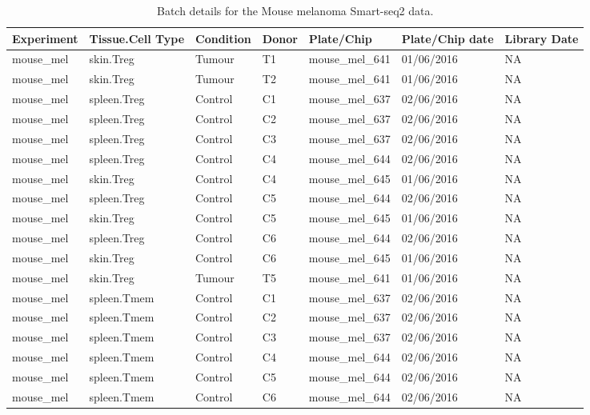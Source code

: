 \begin{table}[htp!]
\scriptsize
\caption[Batch details for the Mouse melanoma Smart-seq2 data]{Batch details for the Mouse melanoma Smart-seq2 data.}
\centering
\label{table:tab_A_batch_SS2_mel}
\begin{tabular}{lllllll}
  \toprule
Experiment & Tissue.Cell Type & Condition & Donor & Plate/Chip & Plate/Chip date & Library Date \\ 
  \midrule
  mouse\_mel & skin.Treg & Tumour & T1 & mouse\_mel\_641 & 01/06/2016 & NA \\ 
  mouse\_mel & skin.Treg & Tumour & T2 & mouse\_mel\_641 & 01/06/2016 & NA \\ 
  mouse\_mel & spleen.Treg & Control & C1 & mouse\_mel\_637 & 02/06/2016 & NA \\ 
  mouse\_mel & spleen.Treg & Control & C2 & mouse\_mel\_637 & 02/06/2016 & NA \\ 
  mouse\_mel & spleen.Treg & Control & C3 & mouse\_mel\_637 & 02/06/2016 & NA \\ 
  mouse\_mel & spleen.Treg & Control & C4 & mouse\_mel\_644 & 02/06/2016 & NA \\ 
  mouse\_mel & skin.Treg & Control & C4 & mouse\_mel\_645 & 01/06/2016 & NA \\ 
  mouse\_mel & spleen.Treg & Control & C5 & mouse\_mel\_644 & 02/06/2016 & NA \\ 
  mouse\_mel & skin.Treg & Control & C5 & mouse\_mel\_645 & 01/06/2016 & NA \\ 
  mouse\_mel & spleen.Treg & Control & C6 & mouse\_mel\_644 & 02/06/2016 & NA \\ 
  mouse\_mel & skin.Treg & Control & C6 & mouse\_mel\_645 & 01/06/2016 & NA \\ 
  mouse\_mel & skin.Treg & Tumour & T5 & mouse\_mel\_641 & 01/06/2016 & NA \\ 
  mouse\_mel & spleen.Tmem & Control & C1 & mouse\_mel\_637 & 02/06/2016 & NA \\ 
  mouse\_mel & spleen.Tmem & Control & C2 & mouse\_mel\_637 & 02/06/2016 & NA \\ 
  mouse\_mel & spleen.Tmem & Control & C3 & mouse\_mel\_637 & 02/06/2016 & NA \\ 
  mouse\_mel & spleen.Tmem & Control & C4 & mouse\_mel\_644 & 02/06/2016 & NA \\ 
  mouse\_mel & spleen.Tmem & Control & C5 & mouse\_mel\_644 & 02/06/2016 & NA \\ 
  mouse\_mel & spleen.Tmem & Control & C6 & mouse\_mel\_644 & 02/06/2016 & NA \\ 

\end{tabular}
\end{table}
